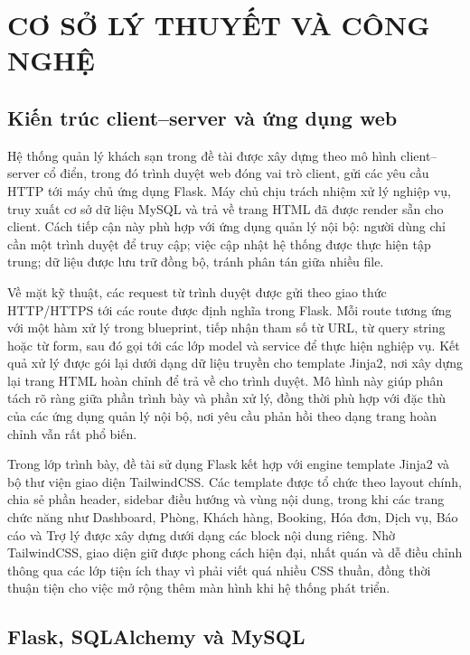 \documentclass[13pt,a4paper]{extreport}
\begin{document}
\chapter{CƠ SỞ LÝ THUYẾT VÀ CÔNG NGHỆ}

\section{Kiến trúc client--server và ứng dụng web}

Hệ thống quản lý khách sạn trong đề tài được xây dựng theo mô hình client--server cổ điển, trong đó trình duyệt web đóng vai trò client, gửi các yêu cầu HTTP tới máy chủ ứng dụng Flask. Máy chủ chịu trách nhiệm xử lý nghiệp vụ, truy xuất cơ sở dữ liệu MySQL và trả về trang HTML đã được render sẵn cho client. Cách tiếp cận này phù hợp với ứng dụng quản lý nội bộ: người dùng chỉ cần một trình duyệt để truy cập; việc cập nhật hệ thống được thực hiện tập trung; dữ liệu được lưu trữ đồng bộ, tránh phân tán giữa nhiều file.

Về mặt kỹ thuật, các request từ trình duyệt được gửi theo giao thức HTTP/HTTPS tới các route được định nghĩa trong Flask. Mỗi route tương ứng với một hàm xử lý trong blueprint, tiếp nhận tham số từ URL, từ query string hoặc từ form, sau đó gọi tới các lớp model và service để thực hiện nghiệp vụ. Kết quả xử lý được gói lại dưới dạng dữ liệu truyền cho template Jinja2, nơi xây dựng lại trang HTML hoàn chỉnh để trả về cho trình duyệt. Mô hình này giúp phân tách rõ ràng giữa phần trình bày và phần xử lý, đồng thời phù hợp với đặc thù của các ứng dụng quản lý nội bộ, nơi yêu cầu phản hồi theo dạng trang hoàn chỉnh vẫn rất phổ biến.

Trong lớp trình bày, đề tài sử dụng Flask kết hợp với engine template Jinja2 và bộ thư viện giao diện TailwindCSS. Các template được tổ chức theo layout chính, chia sẻ phần header, sidebar điều hướng và vùng nội dung, trong khi các trang chức năng như Dashboard, Phòng, Khách hàng, Booking, Hóa đơn, Dịch vụ, Báo cáo và Trợ lý được xây dựng dưới dạng các block nội dung riêng. Nhờ TailwindCSS, giao diện giữ được phong cách hiện đại, nhất quán và dễ điều chỉnh thông qua các lớp tiện ích thay vì phải viết quá nhiều CSS thuần, đồng thời thuận tiện cho việc mở rộng thêm màn hình khi hệ thống phát triển.

\section{Flask, SQLAlchemy và MySQL}
\end{document}
